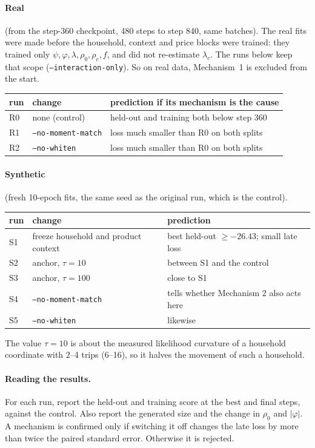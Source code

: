 \documentclass[11pt]{article}
\theoremstyle{remark}\newtheorem{remark}{Remark}
\begin{document}
\paragraph{Real} (from the step-360 checkpoint, 480 steps to step 840, same batches). The real fits
were made before the household, context and price blocks were trained: they trained only
$\psi,\varphi,\lambda,\rho_0,\rho_c,f$, and did not re-estimate $\lambda_c$. The runs below keep that
scope (\texttt{--interaction-only}). So on real data, Mechanism~1 is excluded from the start.
\begin{center}\small
\begin{tabular}{lll}
\toprule
run & change & prediction if its mechanism is the cause\\
\midrule
R0 & none (control) & held-out and training both below step 360\\
R1 & \texttt{--no-moment-match} & loss much smaller than R0 on both splits\\
R2 & \texttt{--no-whiten} & loss much smaller than R0 on both splits\\
\bottomrule
\end{tabular}
\end{center}

\paragraph{Synthetic} (fresh 10-epoch fits, the same seed as the original run, which is the control).
\begin{center}\small
\begin{tabular}{lll}
\toprule
run & change & prediction\\
\midrule
S1 & freeze household and product context & best held-out $\ge-26.43$; small late loss\\
S2 & anchor, $\tau=10$ & between S1 and the control\\
S3 & anchor, $\tau=100$ & close to S1\\
S4 & \texttt{--no-moment-match} & tells whether Mechanism 2 also acts here\\
S5 & \texttt{--no-whiten} & likewise\\
\bottomrule
\end{tabular}
\end{center}
The value $\tau=10$ is about the measured likelihood curvature of a household coordinate with 2--4
trips (6--16), so it halves the movement of such a household.

\paragraph{Reading the results.} For each run, report the held-out and training score at the best
and final steps, against the control. Also report the generated size and the change in $\rho_0$
and $|\varphi|$. A mechanism is confirmed only if switching it off changes the late loss by more
than twice the paired standard error. Otherwise it is rejected.
\end{document}

